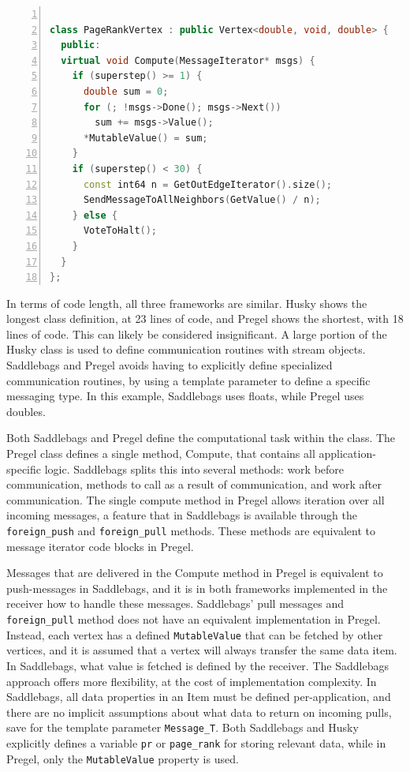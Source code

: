 \documentclass{uit-report}
\begin{document}
\begin{lstlisting}[label={lst:pagerankpregel}, float=h!,frame=tlrb, numbers=left,caption={PageRank vertex class in Pregel}, captionpos=t, language=c++, showstringspaces=false]

class PageRankVertex : public Vertex<double, void, double> {
  public:
  virtual void Compute(MessageIterator* msgs) {
    if (superstep() >= 1) {
      double sum = 0;
      for (; !msgs->Done(); msgs->Next())
        sum += msgs->Value();
      *MutableValue() = sum;
    }
    if (superstep() < 30) {
      const int64 n = GetOutEdgeIterator().size();
      SendMessageToAllNeighbors(GetValue() / n);
    } else {
      VoteToHalt();
    }
  }
};

\end{lstlisting}
\newpage
In terms of code length, all three frameworks are similar. Husky shows the longest class definition, at 23 lines of code, and Pregel shows the shortest, with 18 lines of code. This can likely be considered insignificant. A large portion of the Husky class is used to define communication routines with stream objects. Saddlebags and Pregel avoids having to explicitly define specialized communication routines, by using a template parameter to define a specific messaging type. In this example, Saddlebags uses floats, while Pregel uses doubles.

Both Saddlebags and Pregel define the computational task within the class. The Pregel class defines a single method, Compute, that contains all application-specific logic. Saddlebags splits this into several methods: work before communication, methods to call as a result of communication, and work after communication. The single compute method in Pregel allows iteration over all incoming messages, a feature that in Saddlebags is available through the \texttt{foreign\_push} and \texttt{foreign\_pull} methods. These methods are equivalent to message iterator code blocks in Pregel.

Messages that are delivered in the Compute method in Pregel is equivalent to push-messages in Saddlebags, and it is in both frameworks implemented in the receiver how to handle these messages. Saddlebags' pull messages and \texttt{foreign\_pull} method does not have an equivalent implementation in Pregel. Instead, each vertex has a defined \texttt{MutableValue} that can be fetched by other vertices, and it is assumed that a vertex will always transfer the same data item. In Saddlebags, what value is fetched is defined by the receiver. The Saddlebags approach offers more flexibility, at the cost of implementation complexity. In Saddlebags, all data properties in an Item must be defined per-application, and there are no implicit assumptions about what data to return on incoming pulls, save for the template parameter \texttt{Message\_T}. Both Saddlebags and Husky explicitly defines a variable \texttt{pr} or \texttt{page\_rank} for storing relevant data, while in Pregel, only the \texttt{MutableValue} property is used.
\end{document}

